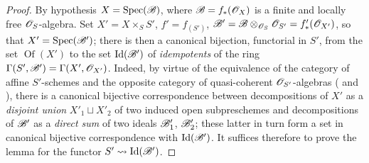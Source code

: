 \begin{proof}
By hypothesis $X=\operatorname{Spec}(\mathscr{B})$, where $\mathscr{B}=f_*(\mathscr{O}_X)$ is a finite and locally free $\mathscr{O}_S$-algebra.
Set $X'=X\times_S S'$, $f'=f_{(S')}$, $\mathscr{B}'=\mathscr{B}\otimes_{\mathscr{O}_S}\mathscr{O}_{S'}=f'_*(\mathscr{O}_{X'})$, so that $X'=\operatorname{Spec}(\mathscr{B}')$;
there is then a canonical bijection, functorial in $S'$, from the set $\operatorname{Of}(X')$ to the set $\operatorname{Id}(\mathscr{B}')$ of \emph{idempotents} of the ring $\Gamma(S',\mathscr{B}')=\Gamma(X',\mathscr{O}_{X'})$.
Indeed, by virtue of the equivalence of the category of affine $S'$-schemes and the opposite category of quasi-coherent $\mathscr{O}_{S'}$-algebras ( and ), there is a canonical bijective correspondence between decompositions of $X'$ as a \emph{disjoint union} $X'_1\sqcup X'_2$ of two induced open subpreschemes and decompositions of $\mathscr{B}'$ as a \emph{direct sum} of two ideals $\mathscr{B}'_1$, $\mathscr{B}'_2$;
these latter in turn form a set in canonical bijective correspondence with $\operatorname{Id}(\mathscr{B}')$.
It suffices therefore to prove the lemma for the functor $S'\leadsto\operatorname{Id}(\mathscr{B}')$.


\end{proof}
